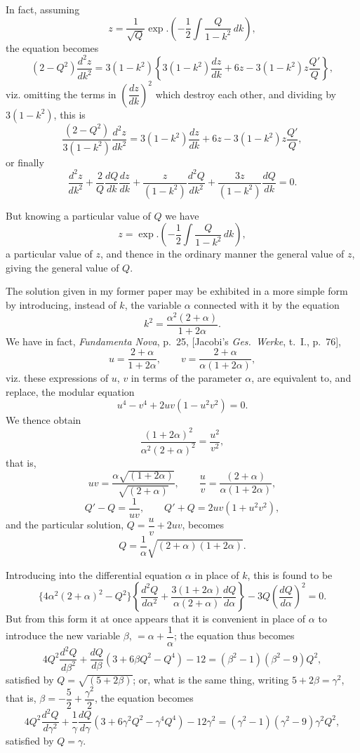 \documentclass[11pt,a4paper]{article}
\begin{document}
In fact, assuming
\[
z = \frac{1}{\sqrt{Q}} \exp.\left(-\frac{1}{2}\int\frac{Q}{1-k^2}\,dk\right),
\]
the equation becomes
\[
(2-Q^2)\frac{d^2z}{dk^2}
  = 3(1-k^2)\left\{
      3(1-k^2)\frac{dz}{dk}
      + 6z
      - 3(1-k^2)z\frac{Q'}{Q}
    \right\},
\]
viz. omitting the terms in $\left(\dfrac{dz}{dk}\right)^2$ which destroy each
other, and dividing by $3(1-k^2)$, this is
\[
\frac{(2-Q^2)}{3(1-k^2)}\frac{d^2z}{dk^2}
  = 3(1-k^2)\frac{dz}{dk} + 6z - 3(1-k^2)z\frac{Q'}{Q},
\]
or finally
\[
\frac{d^2z}{dk^2}
  + \frac{2}{Q}\frac{dQ}{dk}\frac{dz}{dk}
  + \frac{z}{(1-k^2)}\frac{d^2Q}{dk^2}
  + \frac{3z}{(1-k^2)}\frac{dQ}{dk} = 0.
\]

But knowing a particular value of $Q$ we have
\[
z = \exp.\left(-\frac{1}{2}\int\frac{Q}{1-k^2}\,dk\right),
\]
a particular value of $z$, and thence in the ordinary manner the general
value of $z$, giving the general value of $Q$.

The solution given in my former paper may be exhibited in a more simple form
by introducing, instead of $k$, the variable $\alpha$ connected with it by the
equation
\[
k^2 = \frac{\alpha^2(2+\alpha)}{1+2\alpha}.
\]
We have in fact, \textit{Fundamenta Nova}, p.~25, [Jacobi's \textit{Ges.\ Werke},
t.~I., p.~76],
\[
u = \frac{2+\alpha}{1+2\alpha}, \qquad v = \frac{2+\alpha}{\alpha(1+2\alpha)},\]
viz. these expressions of $u$, $v$ in terms of the parameter $\alpha$, are
equivalent to, and replace, the modular equation
\[u^4 - v^4 + 2uv(1-u^2v^2) = 0.\]
We thence obtain
\[
\frac{(1+2\alpha)^2}{\alpha^2(2+\alpha)^2} = \frac{u^2}{v^2},
\]
that is,
\[
uv = \frac{\alpha\sqrt{(1+2\alpha)}}{\sqrt{(2+\alpha)}}, \qquad
\frac{u}{v} = \frac{(2+\alpha)}{\alpha(1+2\alpha)},
\]
\[
Q'-Q = \frac{1}{uv}, \qquad
Q'+Q = 2uv(1+u^2v^2),
\]
and the particular solution, $Q = \dfrac{u}{v} + 2uv$, becomes
\[Q = \frac{1}{\alpha}\sqrt{(2+\alpha)(1+2\alpha)}.\]

Introducing into the differential equation $\alpha$ in place of $k$, this is
found to be
\[
\{4\alpha^2(2+\alpha)^2 - Q^2\}
  \left\{
    \frac{d^2Q}{d\alpha^2}
    + \frac{3(1+2\alpha)}{\alpha(2+\alpha)}\frac{dQ}{d\alpha}
  \right\}
  - 3Q\left(\frac{dQ}{d\alpha}\right)^2 = 0.
\]
But from this form it at once appears that it is convenient in place of
$\alpha$ to introduce the new variable $\beta$, $=\alpha+\dfrac{1}{\alpha}$; the
equation thus becomes
\[
4Q^2\frac{d^2Q}{d\beta^2}
  + \frac{dQ}{d\beta}(3+6\beta Q^2-Q^4) - 12 = (\beta^2-1)(\beta^2-9)Q^2,
\]
satisfied by $Q=\sqrt{(5+2\beta)}$; or, what is the same thing, writing
$5+2\beta=\gamma^2$, that is, $\beta=-\dfrac{5}{2}+\dfrac{\gamma^2}{2}$, the
equation becomes
\[
4Q^2\frac{d^2Q}{d\gamma^2}
  + \frac{1}{\gamma}
    \frac{dQ}{d\gamma}(3+6\gamma^2Q^2-\gamma^4Q^4) - 12\gamma^2
  = (\gamma^2-1)(\gamma^2-9)\gamma^2Q^2,
\]
satisfied by $Q=\gamma$.
\end{document}
